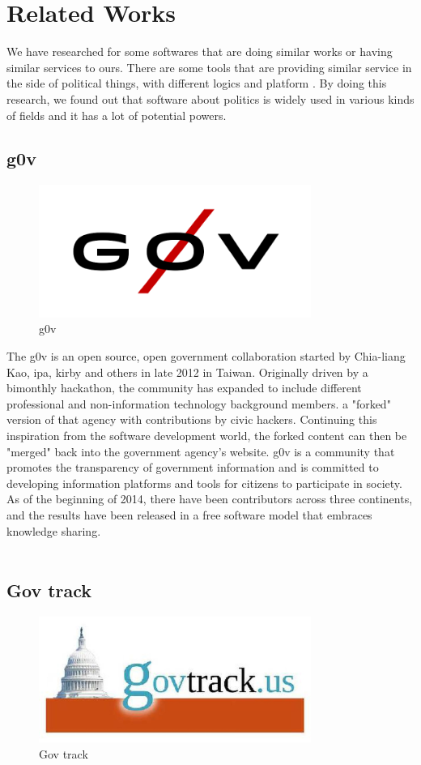 \documentclass[conference]{IEEEtran}
\begin{document}
\section{Related Works}
We have researched for some softwares that are doing similar works or having similar services to ours. There are some tools that are providing similar service in the side of political things, with  different logics and platform . By doing this research, we found out that software about politics is widely used in various kinds of fields and it has a lot of potential powers. 
 
\subsection{g0v}
  \begin{figure}[htbp]
    \centerline{\includegraphics[width=89mm, scale=0.5]{fig/111.png}}
    \caption{g0v}
    \label{fig}
    \end{figure}
The g0v is an open source, open government collaboration started by Chia-liang Kao, ipa, kirby and others in late 2012 in Taiwan. Originally driven by a bimonthly hackathon, the community has expanded to include different professional and non-information technology background members. a "forked" version of that agency with contributions by civic hackers. Continuing this inspiration from the software development world, the forked content can then be "merged" back into the government agency's website. g0v is a community that promotes the transparency of government information and is committed to developing information platforms and tools for citizens to participate in society. As of the beginning of 2014, there have been contributors across three continents, and the results have been released in a free software model that embraces knowledge sharing.
\\
\\
 
\subsection{Gov track}
  \begin{figure}[htbp]
    \centerline{\includegraphics[width=89mm, scale=0.5]{fig/gov_track.jpg}}
    \caption{Gov track}
    \label{fig}
    \end{figure}
    
\end{document}
